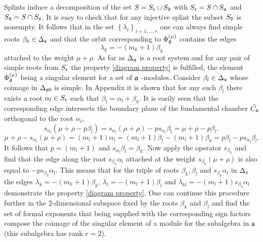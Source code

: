 Splints induce a decomposition of the set $S=S_{\frak{c}}\cup S_{\frak{d}}$
with $S_{\frak{c}}=S\cap S_{\frak{a}}$ and $S_{\frak{d}}=S\cap S_{\frak{s}}$. 
It is easy to check that for any injective splint the subset $S_{%
\frak{d}}$ is nonempty. It follows that in the set $\left\{ \lambda
_{i}\right\} _{i=1,\dots ,r}$ one can always find simple roots $\beta
_{k}\in \Delta _{\frak{s}}$ and that the orbit corresponding to $\Phi _{%
\frak{g}}^{\left( \mu \right) }$ contains the edges
\begin{equation}
\lambda _{k}=-\left( m_{k}+1\right) \beta _{k}  \label{beta edge}
\end{equation}
attached to the weight $\mu +\rho $. As far as $\Delta _{\frak{a}}$ is a
root system and for any pair of simple roots from $S_{\frak{c}}$ the
property \ref{diagram property} is fulfilled, the element $\Phi _{\frak{g}%
}^{\left( \mu \right) }$ being a singular element for a set of $\frak{a}$%
-modules. Consider $\beta _{l}\in \Delta _{\frak{s}}$ whose coimage in $%
\Delta _{\frak{s}0}$ is simple. In Appendix it is shown that for any such $%
\beta _{l}$ there exists a root $\alpha _{l}\in S_{\frak{c}}$ such that
$\beta _{l}=\alpha _{l}+\beta _{k}$. It is easily seen that the
corresponding edge intersects the boundary plane of the fundamental chamber $%
\bar{C_{\frak{a}}}$ orthogonal to the root $\alpha _{l}$,
\begin{equation}
s_{\alpha _{l}}\left( \mu +\rho -p\beta _{l}\right) =s_{\alpha _{l}}\left(
\mu +\rho \right) -ps_{\alpha _{l}}\beta _{l}=\mu +\rho -p\beta _{l},
\label{intersection}
\end{equation}
\begin{equation}
\mu +\rho -s_{\alpha _{l}}\left( \mu +\rho \right) =\left( m_{l}+1\right)
\alpha _{l}=\left( m_{l}+1\right) \beta _{l}-\left( m_{l}+1\right) \beta
_{k}=p\beta _{l}-ps_{\alpha _{l}}\beta _{l}.  
\label{intersection-2}
\end{equation}
It follows that $p=\left( m_{l}+1\right) $ and $s_{\alpha _{l}}\beta
_{l}=\beta _{k}$. Now apply the operator $s_{\beta _{k}}$ and find that the
edge along the root $s_{\beta _{k}}\alpha _{l}$ attached at the weight $%
s_{\beta _{k}}(\mu +\rho )$ is also equal to $-ps_{\beta _{k}}\alpha _{l}$.
This means that for the triple of roots $\beta _{k},\beta _{l}$ and $%
s_{\beta _{k}}\alpha _{l}$ in $\Delta _{\frak{s}}$ the edges $\lambda
_{k}=-\left( m_{k}+1\right) \beta _{k}$, $\lambda _{l}=-\left(
m_{l}+1\right) \beta _{l}$ and $\lambda _{kl}=-\left( m_{l}+1\right)
s_{\beta _{k}}\alpha _{l}$ demonstrate the property \ref{diagram property}.
One can continue this procedure further in the 2-dimensional subspace fixed
by the roots $\beta _{k}$ and $\beta _{l}$ and find the set of formal
exponents that being supplied with the corresponding sign factors compose
the coimage of the singular element of a module for the subalgebra in $\frak{%
s}$ (this subalgebra has rank $r=2$).

